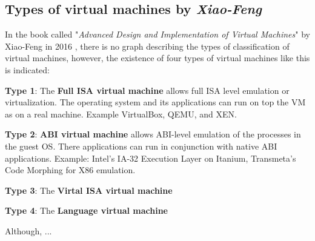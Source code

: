 	\subsection{Types of virtual machines by \textit{Xiao-Feng}}
	
	In the book called "\textit{Advanced Design and Implementation of Virtual Machines}" by Xiao-Feng in 2016 \cite{Xiao-Feng2016}, there is no graph describing the types of classification of virtual machines, however, the existence of four types of virtual machines like this is indicated:
	
	\textbf{Type 1}: The \textbf{Full ISA virtual machine} allows full ISA level emulation or virtualization. The operating system and its applications can run on top the VM as on a real machine. Example VirtualBox, QEMU, and XEN.
	
	\textbf{Type 2}: \textbf{ABI virtual machine} allows ABI-level emulation of the processes in the guest OS. There applications can run in conjunction with native ABI applications. Example: Intel's IA-32 Execution Layer on Itanium, Transmeta's Code Morphing for X86 emulation.
	
	\textbf{Type 3}: The \textbf{Virtal ISA virtual machine}
	
	\textbf{Type 4}: The \textbf{Language virtual machine}
	
	
	
	
	Although,  ...
	